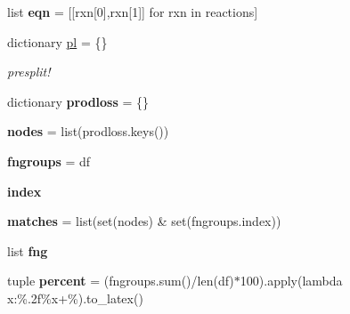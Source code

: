\begin{DoxyCompactItemize}
list {\bfseries eqn} = \mbox{[}\mbox{[}rxn\mbox{[}0\mbox{]},rxn\mbox{[}1\mbox{]}\mbox{]} for rxn in reactions\mbox{]}
\item 
\mbox{\label{namespacedsmacc_1_1parsekpp_1_1functional__group__diff_a906c5467f64159efffbc5d0af0e38ca2}} 
dictionary \mbox{\hyperlink{namespacedsmacc_1_1parsekpp_1_1functional__group__diff_a906c5467f64159efffbc5d0af0e38ca2}{pl}} = \{\}
\begin{DoxyCompactList}\small\item\em presplit! \end{DoxyCompactList}\item 
\mbox{\label{namespacedsmacc_1_1parsekpp_1_1functional__group__diff_ae5416236f23e27b5c3a21bb5fdf42172}} 
dictionary {\bfseries prodloss} = \{\}
\item 
\mbox{\label{namespacedsmacc_1_1parsekpp_1_1functional__group__diff_a04877b9865c2c99cfc8eff0b3c174a30}} 
{\bfseries nodes} = list(prodloss.\+keys())
\item 
\mbox{\label{namespacedsmacc_1_1parsekpp_1_1functional__group__diff_a6d5185dda25c9d1a73ea31d36d4197d2}} 
{\bfseries fngroups} = df
\item 
\mbox{\label{namespacedsmacc_1_1parsekpp_1_1functional__group__diff_a277073ba0f3ea345dead063014c3e79f}} 
{\bfseries index}
\item 
\mbox{\label{namespacedsmacc_1_1parsekpp_1_1functional__group__diff_adacdb91a1ab0e2646c40d72bc69aed23}} 
{\bfseries matches} = list(set(nodes) \& set(fngroups.\+index))
\item 
list {\bfseries fng}
\item 
\mbox{\label{namespacedsmacc_1_1parsekpp_1_1functional__group__diff_a35dcfd14ec00278a659898c73d397a93}} 
tuple {\bfseries percent} = (fngroups.\+sum()/len(df)$\ast$100).apply(lambda x\+:\textquotesingle{}\%.\+2f\textquotesingle{}\%x+\textquotesingle{}\%\textquotesingle{}).\+to\+\_\+latex()

\end{DoxyCompactItemize}
